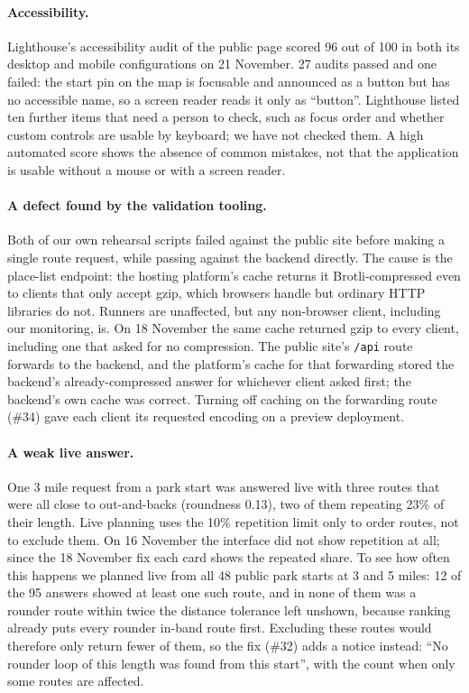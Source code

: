 \paragraph{Accessibility.}
Lighthouse's accessibility audit of the public page scored 96 out of 100 in
both its desktop and mobile configurations on 21 November. 27 audits passed
and one failed: the start pin on the map is focusable and announced as a
button but has no accessible name, so a screen reader reads it only as
``button''. Lighthouse listed ten further items that need a person to check,
such as focus order and whether custom controls are usable by keyboard; we
have not checked them. A high automated score shows the absence of common
mistakes, not that the application is usable without a mouse or with a
screen reader.

\paragraph{A defect found by the validation tooling.}
Both of our own rehearsal scripts failed against the public site before
making a single route request, while passing against the backend directly.
The cause is the place-list endpoint: the hosting platform's cache returns
it Brotli-compressed even to clients that only accept gzip, which browsers
handle but ordinary HTTP libraries do not. Runners are unaffected, but any
non-browser client, including our monitoring, is. On 18 November the same
cache returned gzip to every client, including one that asked for no
compression. The public site's \texttt{/api} route forwards to the backend,
and the platform's cache for that forwarding stored the backend's
already-compressed answer for whichever client asked first; the backend's own
cache was correct. Turning off caching on the forwarding route (\#34) gave
each client its requested encoding on a preview deployment.

\paragraph{A weak live answer.}
One 3 mile request from a park start was answered live with three routes
that were all close to out-and-backs (roundness 0.13), two of them repeating
23\% of their length. Live planning uses the 10\% repetition limit only to
order routes, not to exclude them. On 16 November the interface did not show
repetition at all; since the 18 November fix each card shows the repeated
share. To see how often this happens we planned live from all 48 public park
starts at 3 and 5 miles: 12 of the 95 answers showed at least one such route,
and in none of them was a rounder route within twice the distance tolerance
left unshown, because ranking already puts every rounder in-band route first.
Excluding these routes would therefore only return fewer of them, so the fix
(\#32) adds a notice instead: ``No rounder loop of this length was found
from this start'', with the count when only some routes are affected.

